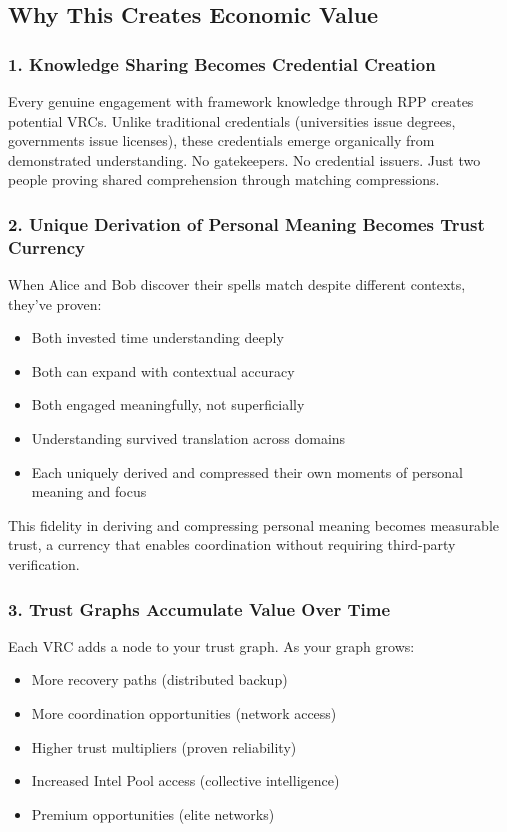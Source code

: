 \documentclass[11pt,a4paper]{article}
\theoremstyle{definition}
\begin{document}
\subsection{Why This Creates Economic Value}

\subsubsection{1. Knowledge Sharing Becomes Credential Creation}

Every genuine engagement with framework knowledge through RPP creates potential VRCs. Unlike traditional credentials (universities issue degrees, governments issue licenses), these credentials emerge organically from demonstrated understanding. No gatekeepers. No credential issuers. Just two people proving shared comprehension through matching compressions.

\subsubsection{2. Unique Derivation of Personal Meaning Becomes Trust Currency}

When Alice and Bob discover their spells match despite different contexts, they've proven:

\begin{itemize}
    \item Both invested time understanding deeply
    \item Both can expand with contextual accuracy
    \item Both engaged meaningfully, not superficially
    \item Understanding survived translation across domains
    \item Each uniquely derived and compressed their own moments of personal meaning and focus
\end{itemize}

This fidelity in deriving and compressing personal meaning becomes measurable trust, a currency that enables coordination without requiring third-party verification.

\subsubsection{3. Trust Graphs Accumulate Value Over Time}

Each VRC adds a node to your trust graph. As your graph grows:

\begin{itemize}
    \item More recovery paths (distributed backup)
    \item More coordination opportunities (network access)
    \item Higher trust multipliers (proven reliability)
    \item Increased Intel Pool access (collective intelligence)
    \item Premium opportunities (elite networks)
\end{itemize}
\end{document}
